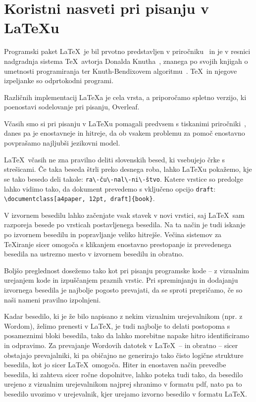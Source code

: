 \documentclass[a4paper,12pt,openright]{book}
\begin{document}
\section{Koristni nasveti pri pisanju v \LaTeX{u}}

Programski paket \LaTeX\ je bil prvotno predstavljen v priročniku~\cite{lamport} in je v resnici nadgradnja sistema \TeX\ avtorja Donalda Knutha~\cite{knuth},
znanega po svojih knjigah o umetnosti programiranja
ter Knuth-Bendixovem algoritmu~\cite{knuth1983simple}.
\TeX\ in njegove izpeljanke so odprtokodni programi.

Različnih implementacij \LaTeX{}a je cela vrsta, a priporočamo 
spletno verzijo, ki poenostavi sodelovanje pri pisanju, Overleaf.

Včasih smo si pri pisanju v \LaTeX{}u  pomagali predvsem s tiskanimi pri\-ro\-čni\-ki~\cite{lamport}, danes pa je enostavneje in hitreje, da ob vsakem problemu za pomoč enostavno povprašamo najljubši jezikovni model.

\LaTeX\ včasih ne zna pravilno deliti slovenskih besed, ki vsebujejo črke s streši\-ca\-mi.
Če taka beseda štrli preko desnega roba,  lahko \LaTeX{}u pokažemo, kje se tako besedo deli takole: \verb=ra\-ču\-nal\-ni\-štvo=.
Katere vrstice so predolge lahko vidimo tako, da dokument prevedemo s vključeno opcijo \texttt{draft}: \verb=\documentclass[a4paper, 12pt, draft]{book}=.

V izvornem besedilu lahko začenjate vsak stavek v novi vrstici, saj \LaTeX\ sam razporeja besede po vrsticah postavljenega besedila.
Na ta način je tudi iskanje po izvornem besedilu in popravljanje veliko hitrejše.
Večina sistemov za \TeX{}iranje sicer omogoča s klikanjem enostavno prestopanje iz prevedenega besedila na ustrezno mesto v izvornem besedilu in obratno.

Boljšo preglednost dosežemo tako kot pri pisanju programske kode -- z vizualnim urejanjem kode in izpuščanjem praznih vrstic.
Pri spreminjanju in dodajanju izvornega besedila je najbolje pogosto prevajati, da se sproti prepričamo, če so naši nameni pravilno izpolnjeni.

Kadar besedilo, ki je že bilo napisano z nekim vizualnim urejevalnikom (npr. z Wordom), želimo prenesti v \LaTeX, je tudi najbolje to delati postopoma s posameznimi bloki besedila,
tako da lahko morebitne napake hitro identificiramo in odpravimo.
Za prevajanje Wordovih datotek v \LaTeX\ -- in obratno -- sicer obstajajo prevajalniki, ki pa običajno ne generirajo tako čisto logične strukture besedila, kot jo sicer \LaTeX\ omogoča.
Hiter in enostaven način prevedbe besedila, ki  zahteva sicer ročne dopolnitve, lahko poteka tudi tako, da besedilo urejeno z vizualnim urejevalnikom najprej shranimo v formatu pdf,
nato pa to besedilo uvozimo v urejevalnik, kjer urejamo izvorno besedilo v formatu \LaTeX.
\end{document}
